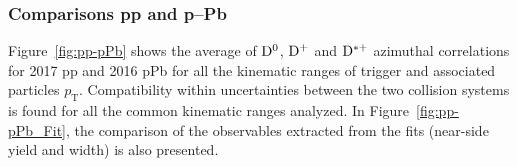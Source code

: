 \subsubsection{Comparisons pp and p--Pb}

Figure~\ref{fig:pp-pPb} shows the average of ${\rm D^0}$, ${\rm D^+}$ and ${\rm D^{*+}}$ azimuthal correlations for 2017 pp and 2016 pPb for all the kinematic ranges of trigger and associated particles $p_\mathrm{T}$. Compatibility within uncertainties between the two collision systems is found for all the common kinematic ranges analyzed. In Figure~\ref{fig:pp-pPb_Fit}, the comparison of the observables extracted from the fits (near-side yield and width) is also presented.

